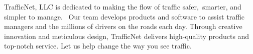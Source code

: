 TrafficNet, LLC is dedicated to making the flow of traffic safer, smarter, and simpler to manage.  Our team develops products and software to assist traffic managers and the millions of drivers on the roads each day. Through creative innovation and meticulous design, TrafficNet delivers high-quality products and top-notch service. Let us help change the way you see traffic.
